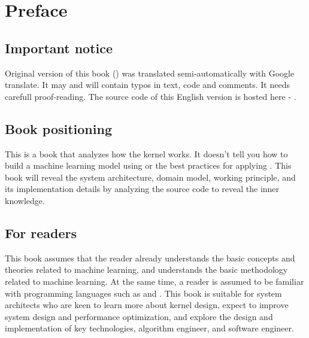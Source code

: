 \chapter{Preface} 
\label{ch:preface}

\section*{Important notice}
\begin{content}
Original version of this book () was translated semi-automatically with Google translate. It may and will contain typos in text, code and comments. It needs carefull proof-reading. The source code of this English version is hosted here - .
\end{content}

\section*{Book positioning}
\begin{content}
This is a book that analyzes how the  kernel works. It doesn't tell you how to build a machine learning model using  or the best practices for applying . This book will reveal the  system architecture, domain model, working principle, and its implementation details by analyzing the  source code to reveal the inner knowledge.
\end{content}


\section*{For readers}
\begin{content}
This book assumes that the reader already understands the basic concepts and theories related to machine learning, and understands the basic methodology related to machine learning. At the same time, a reader is assumed to be familiar with programming languages ​​such as  and .
This book is suitable for system architects who are keen to learn more about  kernel design, expect to improve  system design and performance optimization, and explore the design and implementation of  key technologies,  algorithm engineer, and  software engineer.
\end{content}


